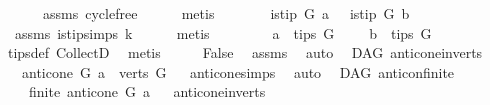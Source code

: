\begin{isabellebody}
\ \ \ \ \ \ assms{\isacharparenleft}{\kern0pt}{}{\isacharparenright}{\kern0pt}\ cycle{\isacharunderscore}{\kern0pt}free\isanewline
\ \ \ \ \isamarkupfalse%
\ {\isacharparenleft}{\kern0pt}metis{\isacharparenright}{\kern0pt}\ \isanewline
\ \ \isamarkupfalse%
\ \isamarkupfalse%
\ {\isachardoublequoteopen}{\isasymnot}\ is{\isacharunderscore}{\kern0pt}tip\ G\ a\ {\isasymor}\ {\isasymnot}\ is{\isacharunderscore}{\kern0pt}tip\ G\ b{\isachardoublequoteclose}\ \isamarkupfalse%
\ \ assms{\isacharparenleft}{\kern0pt}{}{\isacharparenright}{\kern0pt}\ is{\isacharunderscore}{\kern0pt}tip{\isachardot}{\kern0pt}simps\ k\isanewline
\ \ \ \ \isamarkupfalse%
\ {\isacharparenleft}{\kern0pt}metis{\isacharparenright}{\kern0pt}\isanewline
\ \ \isamarkupfalse%
\ \isamarkupfalse%
\ {\isachardoublequoteopen}\ \ {\isasymnot}\ a\ {\isasymin}\ tips\ G\ {\isasymor}\ \ {\isasymnot}\ \ b\ {\isasymin}\ tips\ G{\isachardoublequoteclose}\ \isamarkupfalse%
\ tips{\isacharunderscore}{\kern0pt}def\ CollectD\ \isamarkupfalse%
\ metis\isanewline
\ \ \isamarkupfalse%
\ \isamarkupfalse%
\ False\ \isamarkupfalse%
\ assms\ \isamarkupfalse%
\ auto\isanewline
{}\isamarkupfalse%
%
\endisatagproof
{\isafoldproof}%
%
\isadelimproof
\isanewline
%
\endisadelimproof
\isanewline
{}\isamarkupfalse%
\ {\isacharparenleft}{\kern0pt}\ DAG{\isacharparenright}{\kern0pt}\ anticone{\isacharunderscore}{\kern0pt}in{\isacharunderscore}{\kern0pt}verts{\isacharcolon}{\kern0pt}\ \isanewline
\ \ \ {\isachardoublequoteopen}anticone\ G\ a\ {\isasymsubseteq}\ verts\ G{\isachardoublequoteclose}%
\isadelimproof
\ %
\endisadelimproof
%
\isatagproof
{}\isamarkupfalse%
\ anticone{\isachardot}{\kern0pt}simps\ \isamarkupfalse%
\ auto%
\endisatagproof
{\isafoldproof}%
%
\isadelimproof
%
\endisadelimproof
\isanewline
\isanewline
{}\isamarkupfalse%
\ {\isacharparenleft}{\kern0pt}\ DAG{\isacharparenright}{\kern0pt}\ anticon{\isacharunderscore}{\kern0pt}finite{\isacharcolon}{\kern0pt}\isanewline
\ \ \ \ {\isachardoublequoteopen}finite\ {\isacharparenleft}{\kern0pt}anticone\ G\ a{\isacharparenright}{\kern0pt}{\isachardoublequoteclose}%
\isadelimproof
\ %
\endisadelimproof
%
\isatagproof
{}\isamarkupfalse%
\ anticone{\isacharunderscore}{\kern0pt}in{\isacharunderscore}{\kern0pt}verts\ \isamarkupfalse%

\end{isabellebody}
